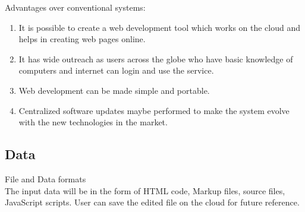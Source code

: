 \documentclass[12pt,a4paper]{article}
\begin{document}
Advantages over conventional systems:
\begin{enumerate}
\item It is possible to create a web development tool which works on the cloud and helps in creating web pages online.
\item It has wide outreach as users across the globe who have basic knowledge of computers and internet can login and use the service.
\item Web development can be made simple and portable.
\item Centralized software updates maybe performed to make the system evolve with the new technologies in the market.
\end{enumerate}

\subsection{Data}
File and Data formats\\
The input data will be in the form of HTML code, Markup files, source files, JavaScript scripts.
User can save the edited file on the cloud for future reference.
\end{document}
